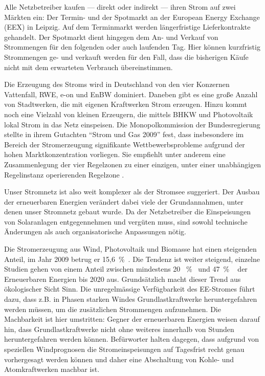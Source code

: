 \documentclass[logo]{fhgart}
\begin{document}
\begin{enumerate}
    Alle Netzbetreiber kaufen --- direkt oder indirekt --- ihren Strom
    auf zwei Märkten ein: Der Termin- und der Spotmarkt an der European
    Energy Exchange (EEX) in Leipzig. Auf dem Terminmarkt werden
    längerfristige Lieferkontrakte gehandelt. Der Spotmarkt dient
    hingegen dem An- und Verkauf von Strommengen für den folgenden oder
    auch laufenden Tag. Hier können kurzfristig Strommengen ge- und
    verkauft werden für den Fall, dass die bisherigen Käufe nicht mit
    dem erwarteten Verbrauch übereinstimmen.

    Die Erzeugung des Stroms wird in Deutschland von den vier Konzernen
    Vattenfall, RWE, e-on und EnBW dominiert. Daneben gibt es eine
    große Anzahl von Stadtwerken, die mit eigenen Kraftwerken Strom
    erzeugen. Hinzu kommt noch eine Vielzahl von kleinen Erzeugern, die
    mittels BHKW und Photovoltaik lokal Strom in das Netz einspeisen.
    Die Monopolkommission der Bundesregierung stellte in ihrem Gutachten
    "`Strom und Gas 2009"' fest, dass insbesondere im Bereich der
    Stromerzeugung signifikante Wettbewerbsprobleme aufgrund der hohen
    Marktkonzentration vorliegen. Sie empfiehlt unter anderem eine
    Zusammenlegung der vier Regelzonen zu einer einzigen, unter einer
    unabhängigen Regelinstanz operierenden Regelzone
    \cite{monopolkommission09stromgas}. 
\end{enumerate}

Unser Stromnetz ist also weit komplexer als der Stromsee suggeriert.  Der
Ausbau der erneuerbaren Energien verändert dabei viele der
Grundannahmen, unter denen unser Stromnetz gebaut wurde. Da der
Netzbetreiber die Einspeisungen von Solaranlagen entgegennehmen und
vergüten muss, sind sowohl technische Änderungen als auch
organisatorische Anpassungen nötig.

Die Stromerzeugung aus Wind, Photovoltaik und Biomasse hat einen
steigenden Anteil, im Jahr 2009 betrug er
15,6~\%~\cite{web:bmwi-energiedaten}.  Die Tendenz ist weiter steigend,
einzelne Studien gehen von einem Anteil zwischen mindestens 20
~\%~\cite{dena05netzstudie1} und 47~\% ~\cite{iwes09simulation} der
Erneuerbaren Energien bis 2020 aus.  Grundsätzlich macht dieser Trend
aus ökologischer Sicht Sinn.  Die unregelmässige Verfügbarkeit des
EE-Stromes führt dazu, dass z.B. in Phasen starken Windes
Grundlastkraftwerke heruntergefahren werden müssen, um die zusätzlichen
Strommengen aufzunehmen. Die Machbarkeit ist hier umstritten:
Gegner der erneuerbaren Energien weisen darauf hin, dass
Grundlastkraftwerke nicht ohne weiteres innerhalb von Stunden
heruntergefahren werden können.  Befürworter halten dagegen, dass
aufgrund von speziellen Windprognosen die Stromeinspeisungen auf
Tagesfrist recht genau vorhergesagt werden können und daher eine
Abschaltung von Kohle- und Atomkraftwerken machbar ist.
\end{document}
